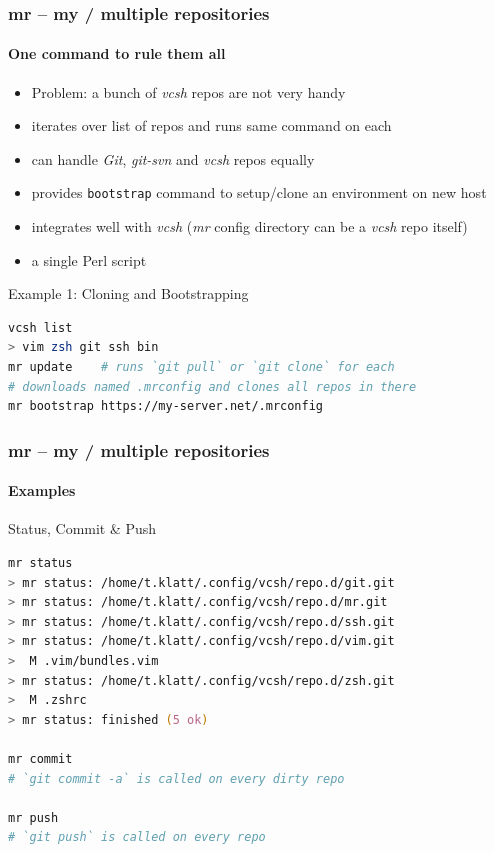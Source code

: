 \documentclass[english,hyperref={pdfpagelabels=false},aspectratio=169]{beamer}
\begin{document}
\begin{frame}[label=mr,fragile]
  \frametitle{mr -- my / multiple repositories}
  \framesubtitle{One command to rule them all}
  \begin{itemize}
    \item Problem: a bunch of \textit{vcsh} repos are not very handy
    \item iterates over list of repos and runs same command on each
    \item can handle \emph{Git}, \emph{git-svn} and \emph{vcsh} repos equally
    \item provides \texttt{bootstrap} command to setup/clone an environment on new host
    \item integrates well with \textit{vcsh} {\scriptsize\color{fzjgray50}(\textit{mr} config directory can be a \textit{vcsh} repo itself)}
    \item a single Perl script
  \end{itemize}
  \begin{block}{Example 1: Cloning and Bootstrapping}
    \vspace{-0.75em}
    \begin{lstlisting}[language=zsh]
vcsh list
> vim zsh git ssh bin
mr update    # runs `git pull` or `git clone` for each
# downloads named .mrconfig and clones all repos in there
mr bootstrap https://my-server.net/.mrconfig
    \end{lstlisting}
    \vspace{-0.75em}
  \end{block}
\end{frame}

\begin{frame}[fragile]
  \frametitle{mr -- my / multiple repositories}
  \framesubtitle{Examples}
  \begin{block}{Status, Commit \& Push}
    \vspace{-0.75em}
    \begin{lstlisting}[language=zsh]
mr status
> mr status: /home/t.klatt/.config/vcsh/repo.d/git.git
> mr status: /home/t.klatt/.config/vcsh/repo.d/mr.git
> mr status: /home/t.klatt/.config/vcsh/repo.d/ssh.git
> mr status: /home/t.klatt/.config/vcsh/repo.d/vim.git
>  M .vim/bundles.vim
> mr status: /home/t.klatt/.config/vcsh/repo.d/zsh.git
>  M .zshrc
> mr status: finished (5 ok)

mr commit
# `git commit -a` is called on every dirty repo

mr push
# `git push` is called on every repo
    \end{lstlisting}
    \vspace{-0.75em}
  \end{block}
\end{frame}
\end{document}
